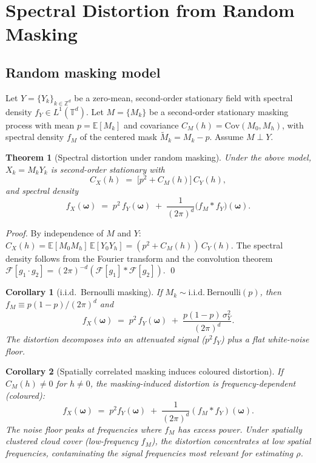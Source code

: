 \documentclass[12pt]{article}
\newtheorem{theorem}{Theorem}
\newtheorem{corollary}{Corollary}
\begin{document}
\section{Spectral Distortion from Random Masking}
\label{sec:masking_random}

\subsection{Random masking model}
\label{sec:random_mask_model}

Let $Y = \{Y_k\}_{k\in\mathbb{Z}^d}$ be a zero-mean, second-order
stationary field with spectral density $f_Y \in L^1(\mathbb{T}^d)$.
Let $M = \{M_k\}$ be a second-order stationary masking process with mean
$p = \mathbb{E}[M_k]$ and covariance $C_M(h) = \mathrm{Cov}(M_0, M_h)$,
with spectral density $f_M$ of the centered mask $\tilde{M}_k = M_k - p$.
Assume $M \perp Y$.

\begin{theorem}[Spectral distortion under random masking]
\label{thm:general_mask}
Under the above model, $X_k = M_k Y_k$ is second-order stationary with
\[
    C_X(h) \;=\; \bigl[p^2 + C_M(h)\bigr]\,C_Y(h),
\]
and spectral density
\[
\boxed{
    f_X(\boldsymbol{\omega})
    \;=\; p^2\, f_Y(\boldsymbol{\omega})
    \;+\; \frac{1}{(2\pi)^d}
          \bigl(f_M \ast f_Y\bigr)(\boldsymbol{\omega}).
}
\]
\end{theorem}

\begin{proof}
By independence of $M$ and $Y$:
$C_X(h) = \mathbb{E}[M_0 M_h]\,\mathbb{E}[Y_0 Y_h]
= (p^2 + C_M(h))\,C_Y(h)$.
The spectral density follows from the Fourier transform and the
convolution theorem $\mathcal{F}[g_1 \cdot g_2]
= (2\pi)^{-d}(\mathcal{F}[g_1] \ast \mathcal{F}[g_2])$. \qed
\end{proof}

\begin{corollary}[i.i.d.\ Bernoulli masking]
\label{cor:iid_mask}
If $M_k \sim \mathrm{i.i.d.\ Bernoulli}(p)$, then $f_M \equiv p(1-p)/(2\pi)^d$
and
\[
    f_X(\boldsymbol{\omega})
    \;=\; p^2\, f_Y(\boldsymbol{\omega})
    \;+\; \frac{p(1-p)\,\sigma^2_Y}{(2\pi)^d}.
\]
The distortion decomposes into an attenuated signal ($p^2 f_Y$) plus
a flat white-noise floor.
\end{corollary}

\begin{corollary}[Spatially correlated masking induces coloured distortion]
\label{cor:corr_mask}
If $C_M(h) \neq 0$ for $h \neq 0$, the masking-induced distortion is
frequency-dependent (coloured):
\[
    f_X(\boldsymbol{\omega})
    \;=\; p^2 f_Y(\boldsymbol{\omega})
    \;+\; \frac{1}{(2\pi)^d}(f_M \ast f_Y)(\boldsymbol{\omega}).
\]
The noise floor peaks at frequencies where $f_M$ has excess power.
Under spatially clustered cloud cover (low-frequency $f_M$), the
distortion concentrates at low spatial frequencies, contaminating
the signal frequencies most relevant for estimating $\rho$.
\end{corollary}
\end{document}
